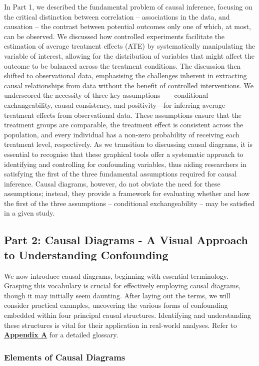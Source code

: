\documentclass[
  singlecolumn]{article}
\begin{document}
In Part 1, we described the fundamental problem of causal inference,
focusing on the critical distinction between correlation -- associations
in the data, and causation -- the contrast between potential outcomes
only one of which, at most, can be observed. We discussed how controlled
experiments facilitate the estimation of average treatment effects (ATE)
by systematically manipulating the variable of interest, allowing for
the distribution of variables that might affect the outcome to be
balanced across the treatment conditions. The discussion then shifted to
observational data, emphasising the challenges inherent in extracting
causal relationships from data without the benefit of controlled
interventions. We underscored the necessity of three key assumptions
---- conditional exchangeability, causal consistency, and
positivity---for inferring average treatment effects from observational
data. These assumptions ensure that the treatment groups are comparable,
the treatment effect is consistent across the population, and every
individual has a non-zero probability of receiving each treatment level,
respectively. As we transition to discussing causal diagrams, it is
essential to recognise that these graphical tools offer a systematic
approach to identifying and controlling for confounding variables, thus
aiding researchers in satisfying the first of the three fundamental
assumptions required for causal inference. Causal diagrams, however, do
not obviate the need for these assumptions; instead, they provide a
framework for evaluating whether and how the first of the three
assumptions -- conditional exchangeability -- may be satisfied in a
given study.

\subsection{Part 2: Causal Diagrams - A Visual Approach to Understanding
Confounding}\label{section-part2}

We now introduce causal diagrams, beginning with essential terminology.
Grasping this vocabulary is crucial for effectively employing causal
diagrams, though it may initially seem daunting. After laying out the
terms, we will consider practical examples, uncovering the various forms
of confounding embedded within four principal causal structures.
Identifying and understanding these structures is vital for their
application in real-world analyses. Refer to
\hyperref[appendix-a]{\textbf{Appendix A}} for a detailed glossary.

\subsubsection{Elements of Causal
Diagrams}\label{elements-of-causal-diagrams}
\end{document}
